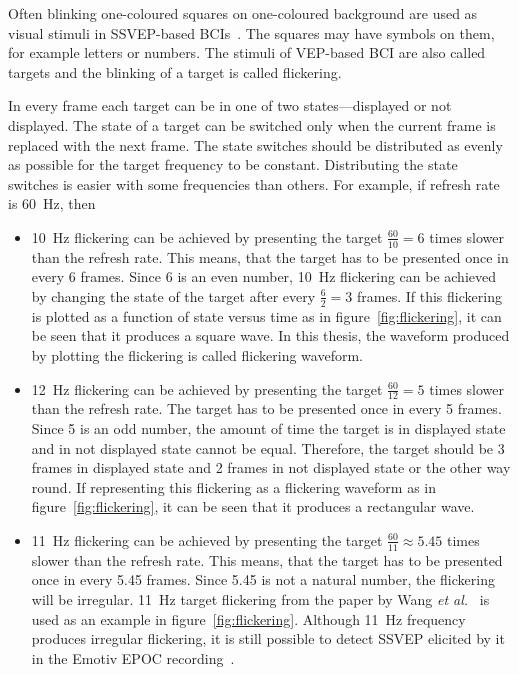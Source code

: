 Often blinking one-coloured squares on one-coloured background are used as visual stimuli in \gls{SSVEP}-based \glspl{BCI}~\cite{ssvep_stim}. The squares may have symbols on them, for example letters or numbers. The stimuli of \gls{VEP}-based \gls{BCI} are also called \glspl{target} and the blinking of a \gls{target} is called \gls{flickering}.

In every \gls{frame} each \gls{target} can be in one of two \glspl{state}---displayed or not displayed. The \gls{state} of a \gls{target} can be switched only when the current \gls{frame} is replaced with the next \gls{frame}. The \gls{state} switches should be distributed as evenly as possible for the target frequency to be constant. Distributing the \gls{state} switches is easier with some frequencies than others. For example, if \gls{refresh rate} is \SI{60}{Hz}, then
\begin{itemize}
	\item \SI{10}{Hz} \gls{flickering} can be achieved by presenting the \gls{target} $\frac{60}{10}=6$ times slower than the \gls{refresh rate}. This means, that the \gls{target} has to be presented once in every 6 \glspl{frame}. Since 6 is an even number, \SI{10}{Hz} \gls{flickering} can be achieved by changing the \gls{state} of the \gls{target} after every $\frac{6}{2} = 3$ \glspl{frame}. If this \gls{flickering} is plotted as a function of \gls{state} versus time as in figure~\ref{fig:flickering}, it can be seen that it produces a \gls{square wave}. In this thesis, the waveform produced by plotting the \gls{flickering} is called \gls{flickering waveform}.
	\item \SI{12}{Hz} \gls{flickering} can be achieved by presenting the \gls{target} $\frac{60}{12}=5$ times slower than the \gls{refresh rate}. The \gls{target} has to be presented once in every 5 \glspl{frame}. Since 5 is an odd number, the amount of time the target is in displayed \gls{state} and in not displayed \gls{state} cannot be equal. Therefore, the \gls{target} should be 3 \glspl{frame} in displayed \gls{state} and 2 \glspl{frame} in not displayed \gls{state} or the other way round. If representing this \gls{flickering} as a \gls{flickering waveform} as in figure~\ref{fig:flickering}, it can be seen that it produces a \gls{rectangular wave}.
	\item \SI{11}{Hz} \gls{flickering} can be achieved by presenting the \gls{target} $\frac{60}{11}\approx 5.45$ times slower than the \gls{refresh rate}. This means, that the \gls{target} has to be presented once in every 5.45 \glspl{frame}. Since 5.45 is not a natural number, the \gls{flickering} will be irregular. \SI{11}{Hz} target \gls{flickering} from the paper by Wang \textit{et al.}~\cite{11hz} is used as an example in figure~\ref{fig:flickering}. Although \SI{11}{Hz} frequency produces irregular \gls{flickering}, it is still possible to detect \gls{SSVEP} elicited by it in the Emotiv EPOC recording~\cite{emotiv_11hz}.
\end{itemize}

